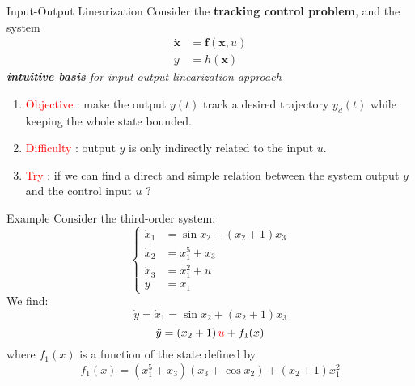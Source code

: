 \documentclass{beamer}
\renewcommand{\vec}[1]{\ensuremath{\boldsymbol{#1}}} %
\begin{document}
\begin{frame}{Input-Output Linearization}
    Consider the \textbf{tracking control problem}, and the system
    \begin{equation}\label{tracking-control}
      \begin{aligned}
        \dot{\vec{x}} &= \vec{f}(\vec{x}, u) \\
        y &= h(\vec{x})
      \end{aligned}
    \end{equation}
    \textit{\textbf{intuitive basis} for input-output linearization approach}
    \begin{enumerate}
      \item \textcolor{red}{Objective} : make the output $y(t)$ track a desired trajectory $y_{d}(t)$ while keeping the whole state bounded.
      \item \textcolor{red}{Difficulty} : output $y$ is only indirectly related to the input $u$.
      \item \textcolor{red}{Try} : if we can find a direct and simple relation between the system output $y$ and the control input $u$ ?
    \end{enumerate}
\end{frame}


\begin{frame}{Example}
Consider the third-order system:
    \begin{equation}\label{third-order}
      \left\{\begin{aligned}
        \dot{x}_{1} &= \sin x_{2}+(x_{2}+1)x_{3} \\
        \dot{x}_{2} &= x_{1}^{5}+x_{3} \\
        \dot{x}_{3} &= x_{1}^{2}+u \\
        y &= x_{1}
      \end{aligned}\right.
    \end{equation}
We find:
    $$
    \dot{y}=\dot{x}_{1}=\sin x_{2}+\left(x_{2}+1\right) x_{3}
    $$
    \begin{equation}\label{double}
      \ddot{y}=\left(x_{2}+1\right) {\color{red}u} +f_{1}(x)
    \end{equation}
where $f_{1}(x)$ is a function of the state defined by
    \begin{equation}\label{f1x}
        f_{1}(x)=\left(x_{1}^{5}+x_{3}\right)\left(x_{3}+\cos x_{2}\right)+\left(x_{2}+1\right) x_{1}^{2}
    \end{equation}
\end{frame}
\end{document}
